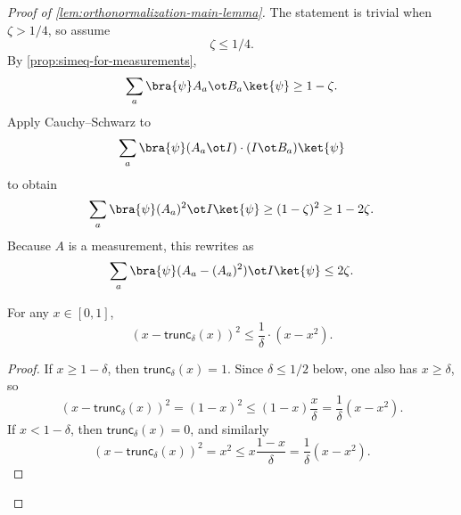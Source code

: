 \begin{proof}[Proof of \ref{lem:orthonormalization-main-lemma}]
	\leanok
	The statement is trivial when $\zeta > 1/4$, so assume
	\begin{equation}\label{eq:assumption-on-zeta}
		\zeta \leq 1/4.
	\end{equation}
	By \ref{prop:simeq-for-measurements},
	\[
		\sum_a \bra{\psi} A_a \ot B_a \ket{\psi} \geq 1-\zeta.
	\]
	Apply Cauchy--Schwarz to
	\[
		\sum_a \bra{\psi} (A_a \ot I)\cdot(I \ot B_a)\ket{\psi}
	\]
	to obtain
	\[
		\sum_a \bra{\psi} (A_a)^2 \ot I \ket{\psi} \geq (1-\zeta)^2 \geq 1-2\zeta.
	\]
	Because $A$ is a measurement, this rewrites as
	\begin{equation}\label{eq:A-looks-projective}
		\sum_a \bra{\psi} (A_a-(A_a)^2) \ot I \ket{\psi} \leq 2\zeta.
	\end{equation}

	\begin{lemma}\label{lem:trunc-inequality}
		\leanok
		For any $x \in [0, 1]$,
		\begin{equation*}
			(x - \mathsf{trunc}_\delta(x))^2 \leq \frac{1}{\delta} \cdot (x - x^2).
		\end{equation*}
	\end{lemma}
	\begin{proof}
		\leanok
		If $x \geq 1-\delta$, then $\mathsf{trunc}_\delta(x)=1$. Since $\delta \leq 1/2$ below, one also has $x \geq \delta$, so
		\[
			(x-\mathsf{trunc}_\delta(x))^2
			=
			(1-x)^2
			\leq
			(1-x)\frac{x}{\delta}
			=
			\frac{1}{\delta}(x-x^2).
		\]
		If $x < 1-\delta$, then $\mathsf{trunc}_\delta(x)=0$, and similarly
		\[
			(x-\mathsf{trunc}_\delta(x))^2
			=
			x^2
			\leq
			x\frac{1-x}{\delta}
			=
			\frac{1}{\delta}(x-x^2).
		\]
	\end{proof}


\end{proof}
